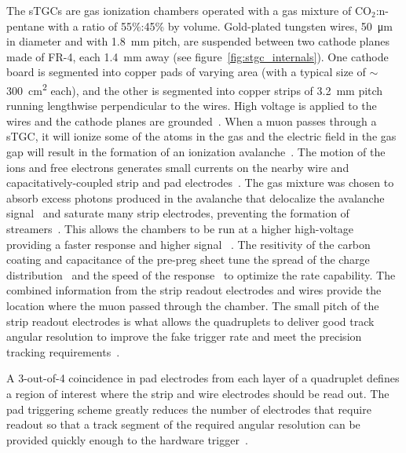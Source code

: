 The sTGCs are gas ionization chambers operated with a gas mixture of CO$_2$:n-pentane with a ratio of 55\%:45\% by volume. Gold-plated tungsten wires, \SI{50}{\micro\meter} in diameter and with \SI{1.8}{mm} pitch, are suspended between two cathode planes made of FR-4, each \SI{1.4}{mm} away (see figure~\ref{fig:stgc_internals}). One cathode board is segmented into copper pads of varying area (with a typical size of $\sim$\SI{300}{cm^2} each), and the other is segmented into copper strips of \SI{3.2}{mm} pitch running lengthwise perpendicular to the wires. High voltage is applied to the wires and the cathode planes are grounded~\cite{nsw_tdr, perez-codina_small-strip_2016}. When a muon passes through a sTGC, it will ionize some of the atoms in the gas and the electric field in the gas gap will result in the formation of an ionization avalanche~\cite{townsend_electricity_1915}. The motion of the ions and free electrons generates small currents on the nearby wire and capacitatively-coupled strip and pad electrodes~\cite{nsw_tdr}. The gas mixture was chosen to absorb excess photons produced in the avalanche that delocalize the avalanche signal~\cite{majewski_thin_1983} and saturate many strip electrodes, preventing the formation of streamers~\cite{grupen_particle_2008}.  This allows the chambers to be run at a higher high-voltage providing a faster response and higher signal~\cite{majewski_thin_1983} . The resitivity of the carbon coating and capacitance of the pre-preg sheet tune the spread of the charge distribution~\cite{gatti_optimum_1979} and the speed of the response~\cite{battistoni_resistive_1982} to optimize the rate capability. The combined information from the strip readout electrodes and wires provide the location where the muon passed through the chamber. The small pitch of the strip readout electrodes is what allows the quadruplets to deliver good track angular resolution to improve the fake trigger rate and meet the precision tracking requirements~\cite{nsw_tdr}.

A 3-out-of-4 coincidence in pad electrodes from each layer of a quadruplet defines a region of interest where the strip and wire electrodes should be read out. The pad triggering scheme greatly reduces the number of electrodes that require readout so that a track segment of the required angular resolution can be provided quickly enough to the hardware trigger~\cite{nsw_tdr}.

